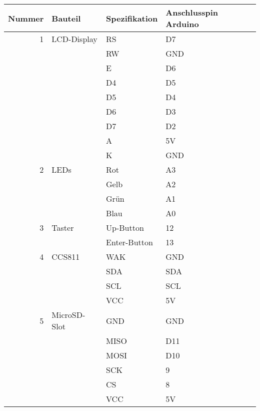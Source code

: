 \label{Installationsanleitung}



\begin{table}[!hbt]
	
	\centering
	
	\begin{tabular}{|r| p{4.5cm} | p{4.3cm} |p{4.3cm}|}
		
		\hline
		Nummer & Bauteil & Spezifikation & Anschlusspin Arduino \\
		\hline
		1 & LCD-Display & RS & D7 \\
		 & & RW & GND \\
		 & & E & D6 \\
		 & & D4 & D5 \\
		 & & D5 & D4 \\
		 & & D6 & D3 \\
		 & & D7 & D2 \\
		 & & A & 5V \\
		 & & K & GND \\
		\hline
		2 & LEDs & Rot & A3 \\
		 & & Gelb & A2\\
		 & & Grün & A1\\
		 & & Blau & A0\\
		\hline
		3 & Taster & Up-Button & 12 \\
		 & & Enter-Button & 13 \\
		\hline	
		4 & CCS811 & WAK & GND \\
		 & & SDA & SDA \\
		 & & SCL & SCL \\
		 & & VCC & 5V \\
		\hline
		5 & MicroSD-Slot & GND & GND \\
		 & & MISO & D11 \\
		 & & MOSI & D10 \\
		 & & SCK & 9 \\
		 & & CS & 8 \\
		 & & VCC & 5V \\
		\hline
	\end{tabular}
	
	\label{tab:PINs}
	
\end{table}